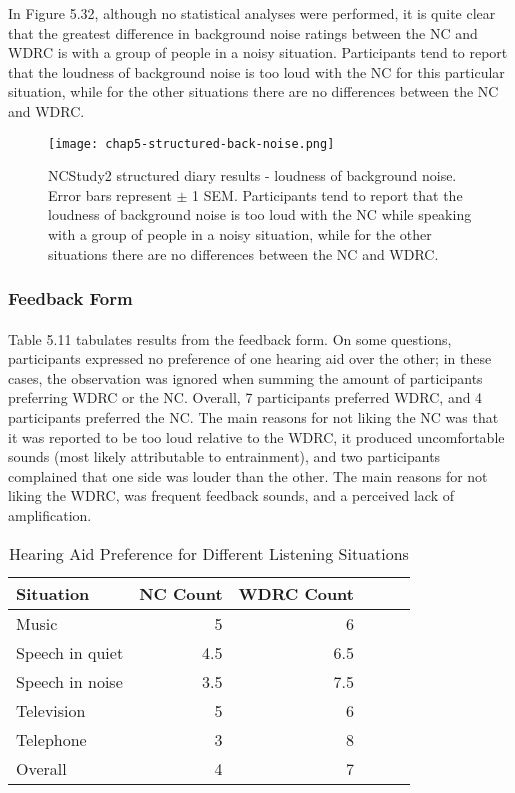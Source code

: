 In Figure 5.32, although no statistical analyses were performed, it is quite clear that the greatest difference in background noise ratings between the NC and WDRC is with a group of people in a noisy situation.  Participants tend to report that the loudness of background noise is too loud with the NC for this particular situation, while for the other situations there are no differences between the NC and WDRC.

\begin{figure}[htp]
\begin{center}
\texttt{[image: chap5-structured-back-noise.png]} \\
\caption[NCStudy2 structured diary results - loudness of background noise]{NCStudy2 structured diary results - loudness of background noise.  Error bars represent $\pm$ 1 SEM.  Participants tend to report that the loudness of background noise is too loud with the NC while speaking with a group of people in a noisy situation, while for the other situations there are no differences between the NC and WDRC.}
\label{chap5-struct-back-noise}
\end{center}
\end{figure}

\subsubsection{Feedback Form}
\paragraph{}Table 5.11 tabulates results from the feedback form.  On some questions, participants expressed no preference of one hearing aid over the other; in these cases, the observation was ignored when summing the amount of participants preferring WDRC or the NC.  Overall, 7 participants preferred WDRC, and 4 participants preferred the NC.  The main reasons for not liking the NC was that it was reported to be too loud relative to the WDRC, it produced uncomfortable sounds (most likely attributable to entrainment), and two participants complained that one side was louder than the other.  The main reasons for not liking the WDRC, was frequent feedback sounds, and a perceived lack of amplification.

\begin{table}[htp]
\begin{center}
\begin{tabular}{lrrrrr}
  \hline
  Situation & NC Count & WDRC Count \\
  \hline
  Music        & 5 & 6 \\
  Speech in quiet & 4.5 & 6.5 \\
  Speech in noise & 3.5 & 7.5 \\
  Television & 5 & 6 \\
  Telephone & 3 & 8 \\
  Overall & 4 & 7 \\
   \hline
\end{tabular}
\end{center}
\caption{Hearing Aid Preference for Different Listening Situations}
\end{table}

